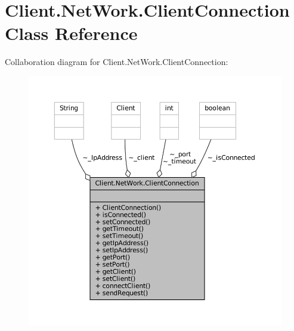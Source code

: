 \hypertarget{classClient_1_1NetWork_1_1ClientConnection}{}\section{Client.\+Net\+Work.\+Client\+Connection Class Reference}
\label{classClient_1_1NetWork_1_1ClientConnection}


Collaboration diagram for Client.\+Net\+Work.\+Client\+Connection\+:
\nopagebreak
\begin{figure}[H]
\begin{center}
\leavevmode
\includegraphics[width=350pt]{classClient_1_1NetWork_1_1ClientConnection__coll__graph}
\end{center}
\end{figure}
